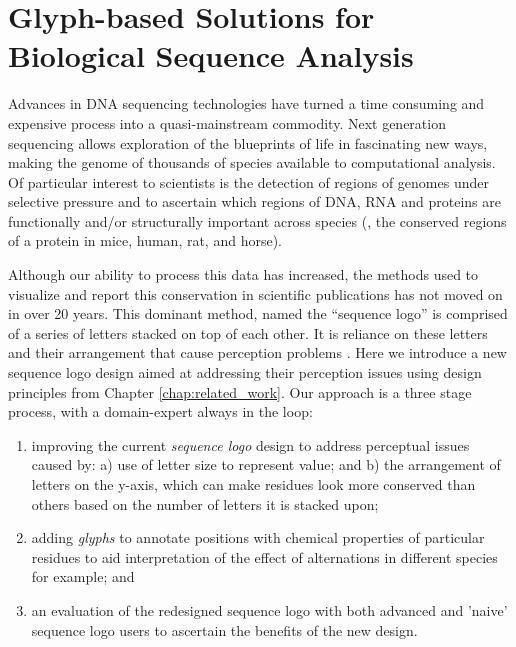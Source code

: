 \section{Glyph-based Solutions for Biological Sequence Analysis}
\label{sec:sequence_logo}

Advances in DNA sequencing technologies have turned a time consuming and expensive process into a quasi-mainstream commodity.
Next generation sequencing allows exploration of the blueprints of life in fascinating new ways, making the genome of thousands of species available to computational analysis.
Of particular interest to scientists is the detection of regions of genomes under selective pressure and to ascertain which regions of DNA, RNA and proteins are functionally and/or structurally important across species (\eg, the conserved regions of a protein in mice, human, rat, and horse).

Although our ability to process this data has increased, the methods used to visualize and report this conservation in scientific publications has not moved on in over 20 years.
This dominant method, named the ``sequence logo'' \cite{Schneider.Stephens1990,Schneider2002} is comprised of a series of letters stacked on top of each other.
It is reliance on these letters and their arrangement that cause perception problems \cite{biovis_redesign}. 
%
Here we introduce a new sequence logo design aimed at addressing their perception issues using design principles from Chapter \ref{chap:related_work}. 
Our approach is a three stage process, with a domain-expert always in the loop:

\begin{enumerate}
\item improving the current \emph{sequence logo} design to address perceptual issues caused by: a) use of letter size to represent value; and b) the arrangement of letters on the y-axis, which can make residues look more conserved than others based on the number of letters it is stacked upon;

\item adding \emph{glyphs} to annotate positions with chemical properties of particular residues to aid interpretation of the effect of alternations in different species for example; and

\item an evaluation of the redesigned sequence logo with both advanced and 'naive' sequence logo users to ascertain the benefits of the new design.
\end{enumerate}

